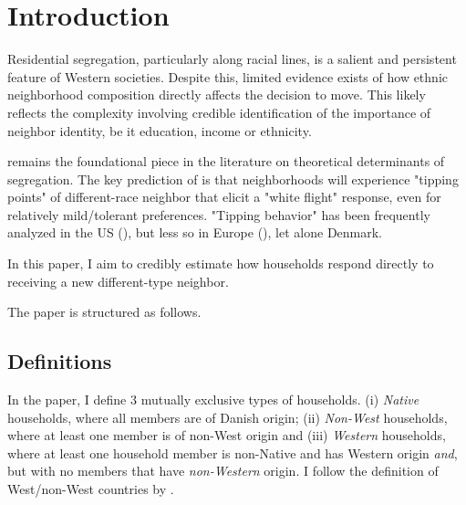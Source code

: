 \documentclass[../main.tex]{subfiles}
\begin{document}
\section{Introduction}

Residential segregation, particularly along racial lines, is a salient and persistent feature of Western societies. Despite this, limited evidence exists of how ethnic neighborhood composition directly affects the decision to move. This likely reflects the complexity involving credible identification of the importance of neighbor identity, be it education, income or ethnicity.     

\textcite{schelling1971dynamic} remains the foundational piece in the literature on theoretical determinants of segregation. The key prediction of \textcite{schelling1971dynamic} is that neighborhoods will experience "tipping points" of different-race neighbor that elicit a "white flight" response, even for relatively mild/tolerant preferences. "Tipping behavior" has been frequently analyzed in the US (\textcite{Ananat_2011, davis2018long, chetty2015impacts}), but less so in Europe (\textcite{bohlmark_willen_2020_tipping}), let alone Denmark. 

In this paper, I aim to credibly estimate how households respond directly to receiving a new different-type neighbor.


The paper is structured as follows. 

\subsection{Definitions}
\label{sec:intro_definitions}
In the paper, I define 3 mutually exclusive types of households. (i) \textit{Native} households, where all members are of Danish origin; (ii) \textit{Non-West} households, where at least one member is of non-West origin and (iii) \textit{Western} households, where at least one household member is non-Native and has Western origin \textit{and}, but with no members that have \textit{non-Western} origin. I follow the definition of West/non-West countries by \textcite{west_non_west_def_dst}.
\end{document}
